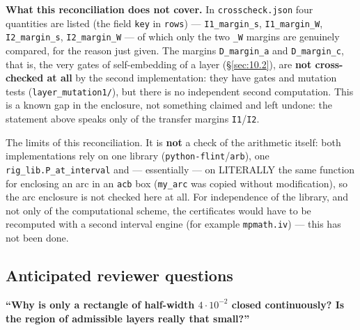 \begin{enumerate}
   \textbf{What this reconciliation does not cover.} In \texttt{crosscheck.json}
   four quantities are listed (the field \texttt{key} in \texttt{rows}) ---
   \texttt{I1\_margin\_s}, \texttt{I1\_margin\_W}, \texttt{I2\_margin\_s}, \texttt{I2\_margin\_W} ---
   of which only the two \texttt{\_W} margins are genuinely compared, for the
   reason just given. The margins
   \texttt{D\_margin\_a} and \texttt{D\_margin\_c}, that is, the very gates of self-embedding
   of a layer (\S\ref{sec:10.2}), are \textbf{not cross-checked at all} by the second
   implementation: they have gates and mutation tests
   (\texttt{layer\_\allowbreak mutation1/}), but there is no independent second computation.
   This is a known gap in the enclosure, not something claimed and left
   undone: the statement above speaks only of the transfer margins
   \texttt{I1}/\texttt{I2}.

   The limits of this reconciliation. It is \textbf{not} a check of the
   arithmetic itself: both implementations rely on one library
   (\texttt{python-flint}/\texttt{arb}), one \texttt{rig\_\allowbreak lib.P\_\allowbreak at\_\allowbreak interval} and --- essentially ---
   on LITERALLY the same function for enclosing an arc in an \texttt{acb} box
   (\texttt{my\_arc} was copied without modification), so the arc enclosure is not
   checked here at all. For independence of the library, and not only of
   the computational scheme, the certificates would have to be recomputed
   with a second interval engine (for example \texttt{mpmath.iv}) --- this has not
   been done.

\end{enumerate}


\subsection{Anticipated reviewer questions}
\label{sec:10.10}

\textbf{``Why is only a rectangle of half-width $4\cdot 10^{-2}$ closed continuously? Is the
region of admissible layers really that small?''}

